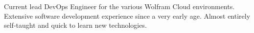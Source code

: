 

\begin{cvparagraph}

Current lead DevOps Engineer for the various Wolfram Cloud environments. Extensive software development experience since a very early age. Almost entirely self-taught and quick to learn new technologies.
\end{cvparagraph}
